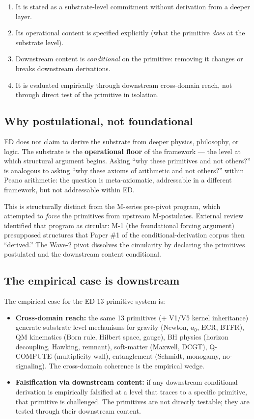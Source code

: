 \documentclass[11pt,a4paper]{article}
\begin{document}
\begin{enumerate}[noitemsep]
\item It is stated as a substrate-level commitment without derivation from a deeper layer.
\item Its operational content is specified explicitly (what the primitive \emph{does} at the substrate level).
\item Downstream content is \emph{conditional} on the primitive: removing it changes or breaks downstream derivations.
\item It is evaluated empirically through downstream cross-domain reach, not through direct test of the primitive in isolation.
\end{enumerate}

\subsection{Why postulational, not foundational}

ED does not claim to derive the substrate from deeper physics, philosophy, or logic. The substrate is the \textbf{operational floor} of the framework --- the level at which structural argument begins. Asking ``why these primitives and not others?'' is analogous to asking ``why these axioms of arithmetic and not others?'' within Peano arithmetic: the question is meta-axiomatic, addressable in a different framework, but not addressable within ED.

This is structurally distinct from the M-series pre-pivot program, which attempted to \emph{force} the primitives from upstream M-postulates. External review identified that program as circular: M-1 (the foundational forcing argument) presupposed structures that Paper \#1 of the conditional-derivation corpus then ``derived.'' The Wave-2 pivot dissolves the circularity by declaring the primitives postulated and the downstream content conditional.

\subsection{The empirical case is downstream}

The empirical case for the ED 13-primitive system is:

\begin{itemize}[noitemsep]
\item \textbf{Cross-domain reach:} the same 13 primitives (+ V1/V5 kernel inheritance) generate substrate-level mechanisms for gravity (Newton, $a_0$, ECR, BTFR), QM kinematics (Born rule, Hilbert space, gauge), BH physics (horizon decoupling, Hawking, remnant), soft-matter (Maxwell, DCGT), Q-COMPUTE (multiplicity wall), entanglement (Schmidt, monogamy, no-signaling). The cross-domain coherence is the empirical wedge.
\item \textbf{Falsification via downstream content:} if any downstream conditional derivation is empirically falsified at a level that traces to a specific primitive, that primitive is challenged. The primitives are not directly testable; they are tested through their downstream content.
\end{itemize}
\end{document}
